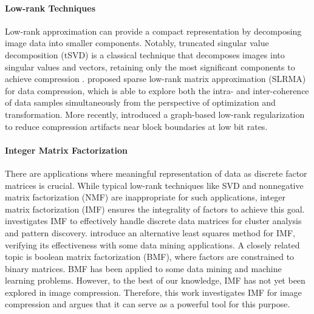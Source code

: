\paragraph{Low-rank Techniques}
Low-rank approximation can provide a compact representation by decomposing image data into smaller components. Notably, truncated singular value decomposition (tSVD) is a classical technique that decomposes images into singular values and vectors, retaining only the most significant components to achieve compression \cite{andrews1976singular, prasantha2007image}. \citet{hou2015sparse} proposed sparse low-rank matrix approximation (SLRMA) for data compression, which is able to explore both the intra- and inter-coherence of data samples simultaneously from the perspective of optimization and transformation.
More recently, \citet{yuan2020image} introduced a graph-based low-rank regularization to reduce compression artifacts near block boundaries at low bit rates.

\paragraph{Integer Matrix Factorization}
There are applications where meaningful representation of data as discrete factor matrices is crucial. While typical low-rank techniques like SVD and nonnegative matrix factorization (NMF) are inappropriate for such applications, integer matrix factorization (IMF) ensures the integrality of factors to achieve this goal. \citet{lin2005integer} investigates IMF to effectively handle discrete data matrices for cluster analysis and pattern discovery. \citet{dong2018integer} introduce an alternative least squares method for IMF, verifying its effectiveness with some data mining applications. A closely related topic is boolean matrix factorization (BMF), where factors are constrained to binary matrices. BMF has been applied to some data mining \cite{miettinen2008discrete} and machine learning \cite{ravanbakhsh2016boolean} problems. However, to the best of our knowledge, IMF has not yet been explored in image compression. Therefore, this work investigates IMF for image compression and argues that it can serve as a powerful tool for this purpose.
